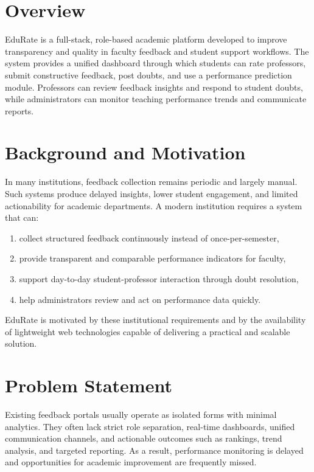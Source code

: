\section{Overview}
EduRate is a full-stack, role-based academic platform developed to improve transparency and quality in faculty feedback and student support workflows. The system provides a unified dashboard through which students can rate professors, submit constructive feedback, post doubts, and use a performance prediction module. Professors can review feedback insights and respond to student doubts, while administrators can monitor teaching performance trends and communicate reports.

\section{Background and Motivation}
In many institutions, feedback collection remains periodic and largely manual. Such systems produce delayed insights, lower student engagement, and limited actionability for academic departments. A modern institution requires a system that can:
\begin{enumerate}[label=\Alph*., leftmargin=1.5em]
    \item collect structured feedback continuously instead of once-per-semester,
    \item provide transparent and comparable performance indicators for faculty,
    \item support day-to-day student-professor interaction through doubt resolution,
    \item help administrators review and act on performance data quickly.
\end{enumerate}
EduRate is motivated by these institutional requirements and by the availability of lightweight web technologies capable of delivering a practical and scalable solution.

\section{Problem Statement}
Existing feedback portals usually operate as isolated forms with minimal analytics. They often lack strict role separation, real-time dashboards, unified communication channels, and actionable outcomes such as rankings, trend analysis, and targeted reporting. As a result, performance monitoring is delayed and opportunities for academic improvement are frequently missed.

